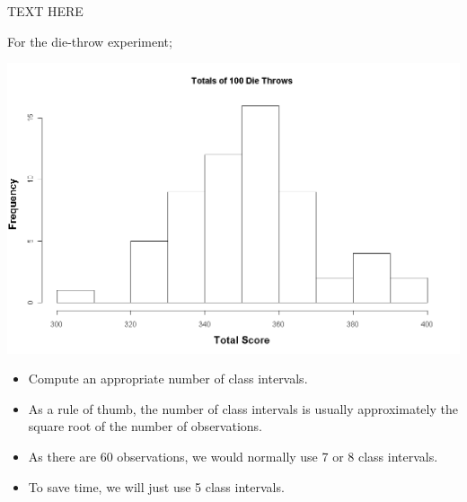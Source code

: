 \documentclass[12pt]{report}
\begin{document}
	
	TEXT HERE
	
	
	For the die-throw experiment;
	\begin{center}
		\includegraphics[scale=0.30]{images/3aDieHist}
	\end{center}
	
	
	\begin{itemize}
		\item Compute an appropriate number of class intervals.
		\item As a rule of thumb, the number of class intervals is usually approximately the square root of the number of observations.
		\item As there are 60 observations, we would normally use 7 or 8 class intervals.
		\item To save time, we will just use 5 class intervals.
	\end{itemize}
	
	
	
\end{document}

